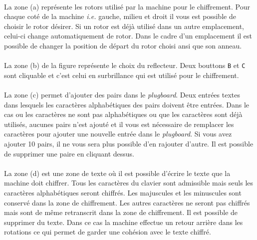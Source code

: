 \documentclass[letterpaper]{article}
\begin{document}
\paragraph{}

La zone (a) représente les rotors utilisé par la machine pour le chiffrement. Pour chaque coté de la machine \textit{i.e.} gauche, milieu et droit il vous est possible de choisir le rotor désirer. Si un rotor est déjà utilisé dans un autre emplacement, celui-ci change automatiquement de rotor. Dans le cadre d'un emplacement il est possible de changer la position de départ du rotor choisi ansi que son anneau.

\paragraph{}
La zone (b) de la figure représente le choix du reflecteur. Deux bouttons \texttt{B} et \texttt{C} sont cliquable et c'est celui en surbrillance qui est utilisé pour le chiffrement.

\paragraph{}

La zone (c) permet d'ajouter des pairs dans le \textit{plugboard}. Deux entrées textes dans lesquels les caractères alphabétiques des pairs doivent être entrées. Dans le cas ou les caractères ne sont pas alphabétiques ou que les caractères sont déjà utilisés, aucunes pairs n'est ajouté et il vous est nécessaire de remplacer les caractères pour ajouter une nouvelle entrée dans le \textit{plugboard}. Si vous avez ajouter 10 pairs, il ne vous sera plus possible d'en rajouter d'autre. Il est possible de supprimer une paire en cliquant dessus.

\paragraph{}

La zone (d) est une zone de texte où il est possible d'écrire le texte que la machine doit chiffrer. Tous les caractères du clavier sont admissible mais seuls les caractères alphabétiques seront chiffrés. Les majuscules et les minuscules sont conservé dans la zone de chiffrement. Les autres caractères ne seront pas chiffrés mais sont de même retranscrit dans la zone de chiffrement. Il est possible de supprimer du texte. Dans ce cas la machine effectue un retour arrière dans les rotations ce qui permet de garder une cohésion avec le texte chiffré.
\end{document}
